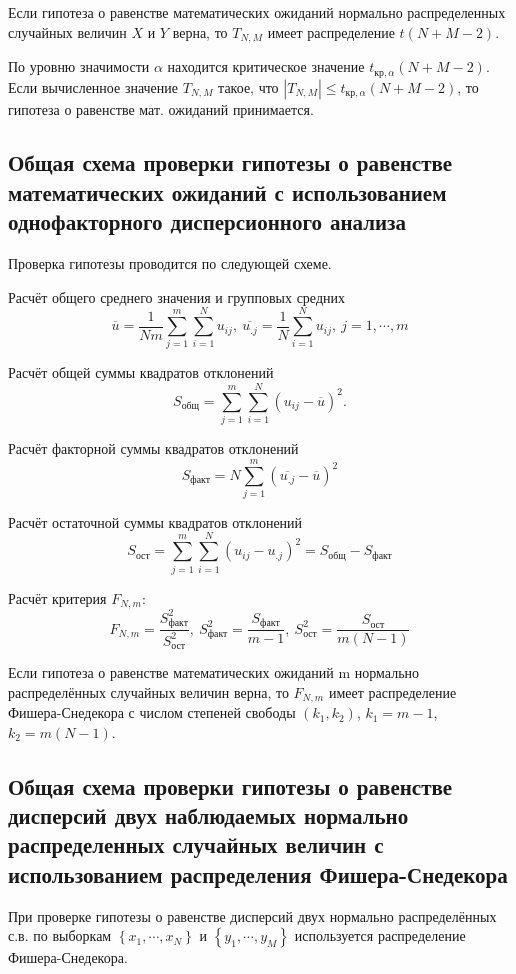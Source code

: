 Если гипотеза о равенстве математических ожиданий нормально распределенных случайных величин $X$ и $Y$ верна, то $T_{N,M}$ имеет распределение $t(N+M-2)$.

По уровню значимости $\alpha$ находится критическое значение $t_{\text{кр}, \alpha}(N+M-2)$. Если вычисленное значение $T_{N,M}$ такое, что $|T_{N,M}| \leq t_{\text{кр}, \alpha}(N+M-2)$, то гипотеза о равенстве мат. ожиданий принимается.


\subsection{Общая схема проверки гипотезы о равенстве математических ожиданий с 
использованием однофакторного дисперсионного анализа}

Проверка гипотезы проводится по следующей схеме. 

Расчёт общего среднего значения и групповых средних
$$
\overline{u} = \frac{1}{N m}\sum\limits_{j=1}^m\sum\limits_{i=1}^N u_{ij}, \: \overline{u_{.j}} = \frac{1}{N}\sum\limits_{i=1}^N u_{ij}, \: j = 1, \cdots, m
$$

Расчёт общей суммы квадратов отклонений
$$
S_{\text{общ}} = \sum\limits_{j=1}^m\sum\limits_{i=1}^N(u_{ij} - \overline{u})^2.
$$

Расчёт факторной суммы квадратов отклонений
$$
S_{\text{факт}} = N\sum\limits_{j=1}^m (\overline{u_{.j}} - \overline{u})^2
$$

Расчёт остаточной суммы квадратов отклонений
$$
S_{\text{ост}} = \sum\limits_{j=1}^m\sum\limits_{i=1}^N(u_{ij} - u_{.j})^2 = S_{\text{общ}} - S_{\text{факт}}
$$

Расчёт критерия $F_{N,m}$:
$$
F_{N,m} = \frac{S_{\text{факт}}^2}{S_{\text{ост}}^2}, \: S_{\text{факт}}^2 = \frac{S_{\text{факт}}}{m-1}, \: S_{\text{ост}}^2 = \frac{S_{\text{ост}}}{m(N-1)}
$$

Если гипотеза о равенстве математических ожиданий m нормально распределённых случайных величин верна, то $F_{N,m}$ имеет распределение Фишера-Снедекора с числом степеней свободы $(k_1, k_2)$, $k_1 = m-1$, $k_2 = m(N-1)$.

\subsection{Общая схема проверки гипотезы о равенстве дисперсий двух наблюдаемых 
нормально распределенных случайных величин с использованием распределения
Фишера-Снедекора}

При проверке гипотезы о равенстве дисперсий двух нормально распределённых с.в. по выборкам $\left\{x_1,\cdots, x_N\right\}$ и $\left\{y_1,\cdots, y_M\right\}$ используется распределение Фишера-Снедекора.

